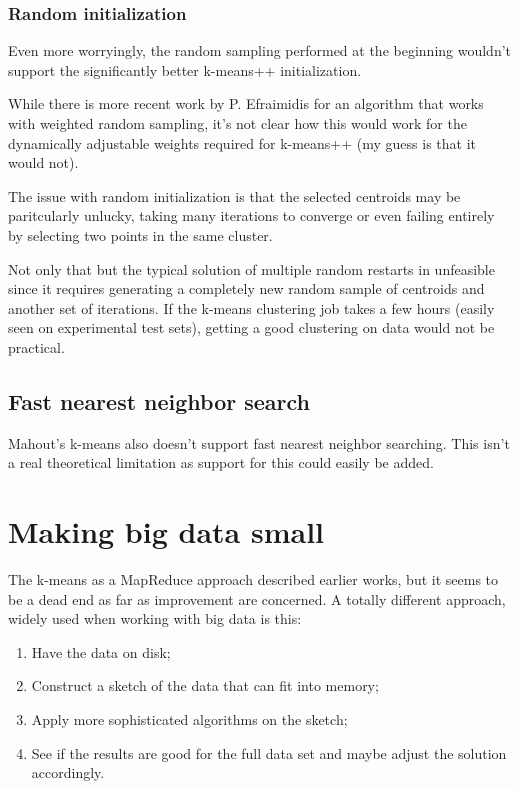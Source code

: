 \documentclass{article}
\begin{document}
\subsubsection{Random initialization}
Even more worryingly, the random sampling performed at the beginning wouldn't
support the significantly better k-means++ initialization.

While there is more recent work by P. Efraimidis \cite{efraimidis} for
an algorithm that works with weighted random sampling, it's not clear how this
would work for the dynamically adjustable weights required for k-means++ (my
guess is that it would not).

The issue with random initialization is that the selected centroids may be
paritcularly unlucky, taking many iterations to converge or even failing
entirely by selecting two points in the same cluster.

Not only that but the typical solution of multiple random restarts in
unfeasible since it requires generating a completely new random sample of
centroids and another set of iterations. If the k-means clustering job takes a
few hours (easily seen on experimental test sets), getting a good clustering on
data would not be practical.

\subsection{Fast nearest neighbor search}
Mahout's k-means also doesn't support fast nearest neighbor searching. This
isn't a real theoretical limitation as support for this could easily be added.

\section{Making big data small}

The k-means as a MapReduce approach described earlier works, but it seems to be
a dead end as far as improvement are concerned.
A totally different approach, widely used when working with big data is
this:
\begin{enumerate}
    \item Have the data on disk;
    \item Construct a sketch of the data that can fit into memory;
    \item Apply more sophisticated algorithms on the sketch;
    \item See if the results are good for the full data set and maybe adjust
        the solution accordingly.
\end{enumerate}
\end{document}
